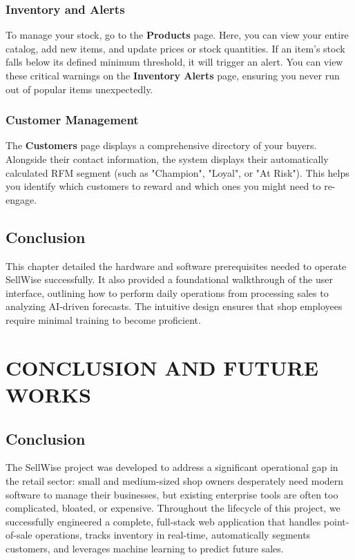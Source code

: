 \documentclass[12pt,a4paper]{report}
\begin{document}
\subsection{Inventory and Alerts}
To manage your stock, go to the \textbf{Products} page. Here, you can view your entire catalog, add new items, and update prices or stock quantities. If an item's stock falls below its defined minimum threshold, it will trigger an alert. You can view these critical warnings on the \textbf{Inventory Alerts} page, ensuring you never run out of popular items unexpectedly.

\subsection{Customer Management}
The \textbf{Customers} page displays a comprehensive directory of your buyers. Alongside their contact information, the system displays their automatically calculated RFM segment (such as "Champion", "Loyal", or "At Risk"). This helps you identify which customers to reward and which ones you might need to re-engage.

\section{Conclusion}
This chapter detailed the hardware and software prerequisites needed to operate SellWise successfully. It also provided a foundational walkthrough of the user interface, outlining how to perform daily operations from processing sales to analyzing AI-driven forecasts. The intuitive design ensures that shop employees require minimal training to become proficient.


\chapter{CONCLUSION AND FUTURE WORKS}

\section{Conclusion}
The SellWise project was developed to address a significant operational gap in the retail sector: small and medium-sized shop owners desperately need modern software to manage their businesses, but existing enterprise tools are often too complicated, bloated, or expensive. Throughout the lifecycle of this project, we successfully engineered a complete, full-stack web application that handles point-of-sale operations, tracks inventory in real-time, automatically segments customers, and leverages machine learning to predict future sales.
\end{document}
